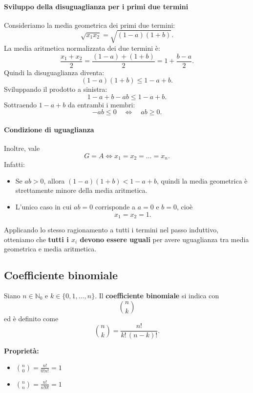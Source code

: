 {    \paragraph{Sviluppo della disuguaglianza per i primi due termini}
    Consideriamo la media geometrica dei primi due termini:
    \[
    \sqrt{x_1 x_2} = \sqrt{(1-a)(1+b)}.
    \]
    La media aritmetica normalizzata dei due termini è:
    \[
    \frac{x_1 + x_2}{2} = \frac{(1-a) + (1+b)}{2} = 1 + \frac{b-a}{2}.
    \]
    Quindi la disuguaglianza diventa:
    \[
    (1-a)(1+b) \le 1-a+b.
    \]
    Sviluppando il prodotto a sinistra:
    \[
    1 - a + b - ab \le 1 - a + b.
    \]
    Sottraendo $1 - a + b$ da entrambi i membri:
    \[
    -ab \le 0 \quad \Longleftrightarrow \quad ab \ge 0.
    \]

    \paragraph{Condizione di uguaglianza}
    Inoltre, vale
    \[
    G = A \iff x_1 = x_2 = \dots = x_n.
    \]
    Infatti:
    \begin{itemize}
        \item Se $ab > 0$, allora $(1-a)(1+b) < 1-a+b$, quindi la media geometrica è strettamente minore della media aritmetica.
        \item L’unico caso in cui $ab = 0$ corrisponde a $a = 0$ e $b = 0$, cioè
        \[
        x_1 = x_2 = 1.
        \]
    \end{itemize}

    Applicando lo stesso ragionamento a tutti i termini nel passo induttivo, otteniamo che \textbf{tutti i $x_i$ devono essere uguali} per avere uguaglianza tra media geometrica e media aritmetica.
}

\subsection{Coefficiente binomiale}
Siano $n \in \mathbb{N}_{0}$ e $k \in \{0, 1, \dots, n\}$. Il \textbf{coefficiente binomiale} si indica con
$$
\binom{n}{k}
$$
ed è definito come
$$
\binom{n}{k} = \frac{n!}{k! \, (n-k)!}.
$$

\textbf{Proprietà:}
\begin{itemize}
\item $\displaystyle \binom{n}{0} = \frac{n!}{0!n!}=1$
\item $\displaystyle \binom{n}{n} = \frac{n!}{n!0!}= 1$
\end{itemize}

